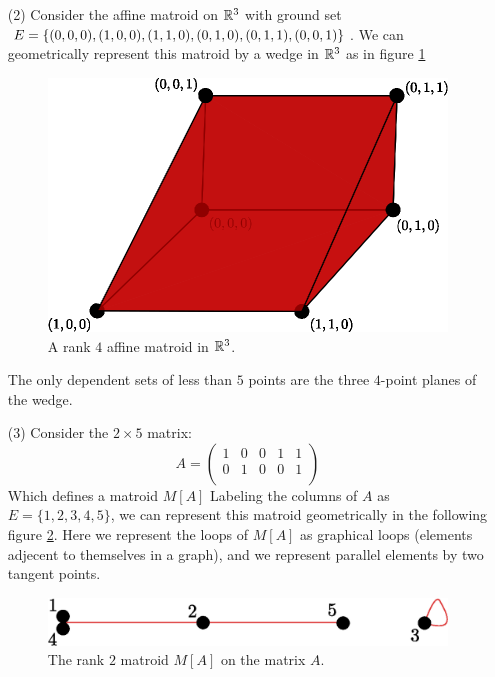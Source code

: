 \begin{example}
\begin{enumerate}
        \item[(2)] Consider the affine matroid on $\mathbb{R}^3$ with ground set
            $E=\{(0,0,0), (1,0,0), (1,1,0), (0,1,0), (0,1,1), \\ (0,0,1)\}$. We
            can geometrically represent this matroid by a wedge in $\mathbb{R}^3$ as in
            figure \ref{fig_1.10}
             \begin{figure}[h]
                \centering
                \includegraphics[scale=0.8]{Figures/Chapter1/rank_4_affine.eps}
                \caption{A rank $4$ affine matroid in  $\mathbb{R}^3$.}
                \label{fig_1.10}
            \end{figure}
            The only dependent sets of less than $5$ points are the three
            $4$-point planes of the wedge.

        \item[(3)] Consider the $2 \times 5$ matrix:
            \begin{equation*}
                A=\begin{pmatrix}
                    1   &   0   &   0   &   1   &   1   \\
                    0   &   1   &   0   &   0   &   1   \\
                  \end{pmatrix}
            \end{equation*}
            Which defines a matroid $M[A]$ Labeling the columns of $A$ as
            $E=\{1,2,3,4,5\}$, we can represent this matroid geometrically in the
            following figure \ref{fig_1.11}. Here we represent the loops of $M[A]$ as
            graphical loops (elements adjecent to themselves in a graph), and we
            represent parallel elements by two tangent points.
            \begin{figure}[h]
                \centering
                \includegraphics[scale=0.8]{Figures/Chapter1/rank_2_matroid.eps}
                \caption{The rank $2$ matroid $M[A]$ on the matrix $A$.}
                \label{fig_1.11}
            \end{figure}
    \end{enumerate}
\end{example}

